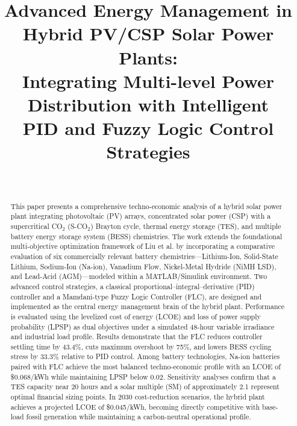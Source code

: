 \documentclass[journal]{IEEEtran}
\begin{document}
\title{Advanced Energy Management in Hybrid PV/CSP Solar Power Plants:\\
Integrating Multi-level Power Distribution with Intelligent\\
PID and Fuzzy Logic Control Strategies}

\author{
    \\
}


\maketitle

\begin{abstract}
This paper presents a comprehensive techno-economic analysis of a hybrid solar power plant integrating photovoltaic (PV) arrays, concentrated solar power (CSP) with a supercritical CO$_2$ (S-CO$_2$) Brayton cycle, thermal energy storage (TES), and multiple battery energy storage system (BESS) chemistries. The work extends the foundational multi-objective optimization framework of Liu et al. by incorporating a comparative evaluation of six commercially relevant battery chemistries---Lithium-Ion, Solid-State Lithium, Sodium-Ion (Na-ion), Vanadium Flow, Nickel-Metal Hydride (NiMH LSD), and Lead-Acid (AGM)---modeled within a MATLAB/Simulink environment. Two advanced control strategies, a classical proportional--integral--derivative (PID) controller and a Mamdani-type Fuzzy Logic Controller (FLC), are designed and implemented as the central energy management brain of the hybrid plant. Performance is evaluated using the levelized cost of energy (LCOE) and loss of power supply probability (LPSP) as dual objectives under a simulated 48-hour variable irradiance and industrial load profile. Results demonstrate that the FLC reduces controller settling time by 43.4\%, cuts maximum overshoot by 75\%, and lowers BESS cycling stress by 33.3\% relative to PID control. Among battery technologies, Na-ion batteries paired with FLC achieve the most balanced techno-economic profile with an LCOE of \$0.068/kWh while maintaining LPSP below 0.02. Sensitivity analyses confirm that a TES capacity near 20 hours and a solar multiple (SM) of approximately 2.1 represent optimal financial sizing points. In 2030 cost-reduction scenarios, the hybrid plant achieves a projected LCOE of \$0.045/kWh, becoming directly competitive with base-load fossil generation while maintaining a carbon-neutral operational profile.
\end{abstract}
\end{document}
